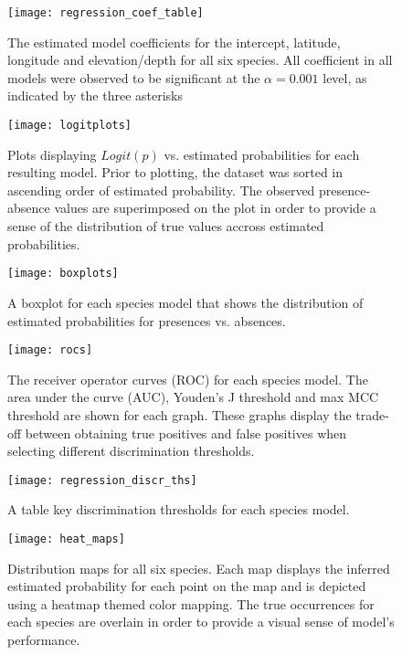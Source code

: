 \begin{figure}
    \texttt{[image: regression\_coef\_table]}
    \caption{
        The estimated model coefficients for the intercept, latitude, longitude and elevation/depth for all six species.
        All coefficient in all models were observed to be significant at the $\alpha=0.001$ level, as indicated by the three asterisks
    }
    \label{fig:reg_coefs}
\end{figure}



\begin{figure}
    \texttt{[image: logitplots]}
    \caption{
        Plots displaying $Logit(p)$ vs. estimated probabilities for each resulting model.
        Prior to plotting, the dataset was sorted in ascending order of estimated probability.
        The observed presence-absence values are superimposed on the plot in order to provide a sense of the
        distribution of true values accross estimated probabilities.
    }
    \label{fig:logitplots}
\end{figure}


\begin{figure}
    \texttt{[image: boxplots]}
    \caption{
        A boxplot for each species model that shows the distribution of estimated probabilities for presences vs. absences.
    }
    \label{fig:boxplots}
\end{figure}



\begin{figure}
    \texttt{[image: rocs]}
    \caption{
        The receiver operator curves (ROC) for each species model.
        The area under the curve (AUC), Youden's J threshold and max MCC threshold are shown for each graph.
        These graphs display the trade-off between obtaining true positives and false positives when selecting different discrimination thresholds.
    }
    \label{fig:rocs}
\end{figure}



\begin{figure}
    \texttt{[image: regression\_discr\_ths]}
    \caption{
        A table key discrimination thresholds for each species model.
    }
    \label{fig:regression_discr_ths}
\end{figure}



\begin{figure}
    \texttt{[image: heat\_maps]}
    \caption{
        Distribution maps for all six species.
        Each map displays the inferred estimated probability for each point on the map and is depicted using a heatmap themed color mapping.
        The true occurrences for each species are overlain in order to provide a visual sense of model's performance.
    }
    \label{fig:heat_maps}
\end{figure}


